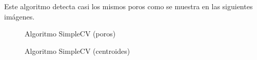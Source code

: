 Este algoritmo detecta casi los mismos poros como se muestra en las siguientes imágenes. \\

    \begin{figure}[H]
      \caption{Algoritmo SimpleCV (poros)}
      \centering \setlength\fboxsep{0pt} \setlength\fboxrule{0.5pt}
    \end{figure}

    \begin{figure}[H]
      \caption{Algoritmo SimpleCV (centroides)}
      \centering \setlength\fboxsep{0pt} \setlength\fboxrule{0.5pt}
    \end{figure}

